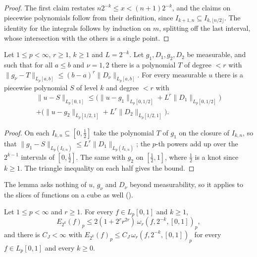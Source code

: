 \begin{proof}
\leanok
The first claim restates $n 2^{-k} \leq x < (n+1) 2^{-k}$, and the claims on piecewise
polynomials follow from their definition, since $I_{k+1,n} \subseteq I_{k,\lfloor n/2 \rfloor}$.
The identity for the integrals follows by induction on $m$, splitting off the last interval,
whose intersection with the others is a single point.
\end{proof}

\begin{lemma}
\label{lem:pp-taylor}
\leanok
{}
Let $1 \leq p < \infty$, $r \geq 1$, $k \geq 1$ and $L = 2^{-k}$. Let $g_1, D_1, g_2, D_2$ be
measurable, and such that for all $a \leq b$ and $\nu = 1, 2$ there is a polynomial $T$ of degree
$< r$ with $\|g_\nu - T\|_{L_p[a,b]} \leq (b - a)^r \|D_\nu\|_{L_p[a,b]}$. For every measurable $u$
there is a piecewise polynomial $S$ of level $k$ and degree $< r$ with
\begin{multline*}
  \|u - S\|_{L_p[0,1]} \leq \bigl( \|u - g_1\|_{L_p[0,1/2]} + L^r \|D_1\|_{L_p[0,1/2]} \bigr) \\
    + \bigl( \|u - g_2\|_{L_p[1/2,1]} + L^r \|D_2\|_{L_p[1/2,1]} \bigr) .
\end{multline*}
\end{lemma}

\begin{proof}
\leanok
On each $I_{k,n} \subseteq [0, \tfrac12]$ take the polynomial $T$ of $g_1$ on the closure of
$I_{k,n}$, so that $\|g_1 - S\|_{L_p(I_{k,n})} \leq L^r \|D_1\|_{L_p(I_{k,n})}$; the $p$-th powers
add up over the $2^{k-1}$ intervals of $[0, \tfrac12]$. The same with $g_2$ on $[\tfrac12, 1]$,
where $\tfrac12$ is a knot since $k \geq 1$. The triangle inequality on each half gives the bound.
\end{proof}

The lemma asks nothing of $u$, $g_\nu$ and $D_\nu$ beyond measurability, so it applies to the
slices of functions on a cube as well ().

\begin{theorem}
\label{thm:pp-jackson}
\leanok
{}
Let $1 \leq p < \infty$ and $r \geq 1$. For every $f \in L_p[0,1]$ and $k \geq 1$,
\[
  E_{2^k}(f)_p \leq 2 (1 + 2^r r^{2r}) \, \omega_r(f, 2^{-k}, [0,1])_p ,
\]
and there is $C_J < \infty$ with $E_{2^k}(f)_p \leq C_J \, \omega_r(f, 2^{-k}, [0,1])_p$ for
every $f \in L_p[0,1]$ and every $k \geq 0$.
\end{theorem}

